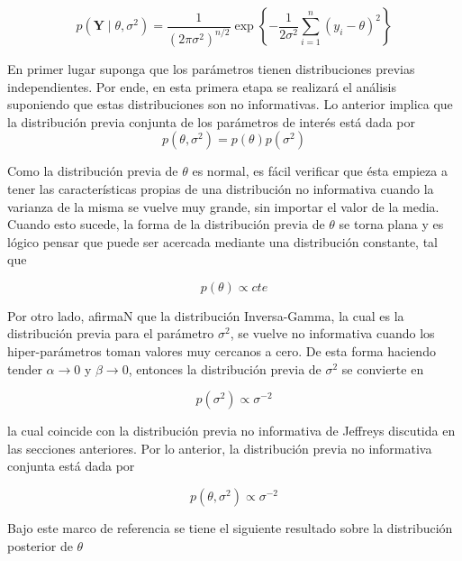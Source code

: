 \documentclass[
  10pt,
  spanish,
]{book}
\theoremstyle{definition}
\theoremstyle{definition}
\theoremstyle{definition}
\theoremstyle{definition}
\theoremstyle{remark}
\begin{document}
\begin{equation*}
\label{eq:VeroNormal}
p(\mathbf{Y} \mid \theta, \sigma^2)=\frac{1}{(2\pi\sigma^2)^{n/2}}\exp\left\{-\frac{1}{2\sigma^2}\sum_{i=1}^n(y_i-\theta)^2\right\}
\end{equation*}

En primer lugar suponga que los parámetros tienen distribuciones previas independientes. Por ende, en esta primera etapa se realizará el análisis suponiendo que estas distribuciones son no informativas. Lo anterior implica que la distribución previa conjunta de los parámetros de interés está dada por
\begin{equation}
p(\theta,\sigma^2)=p(\theta)p(\sigma^2)
\end{equation}

Como la distribución previa de \(\theta\) es normal, es fácil verificar que ésta empieza a tener las características propias de una distribución no informativa cuando la varianza de la misma se vuelve muy grande, sin importar el valor de la media. Cuando esto sucede, la forma de la distribución previa de \(\theta\) se torna plana y es lógico pensar que puede ser acercada mediante una distribución constante, tal que

\begin{equation*}
p(\theta)\propto cte
\end{equation*}

Por otro lado, \citet{Gelman03} afirmaN que la distribución Inversa-Gamma, la cual es la distribución previa para el parámetro \(\sigma^2\), se vuelve no informativa cuando los hiper-parámetros toman valores muy cercanos a cero. De esta forma haciendo tender \(\alpha \longrightarrow 0\) y \(\beta \longrightarrow 0\), entonces la distribución previa de \(\sigma^2\) se convierte en

\begin{equation*}
p(\sigma^2)\propto \sigma^{-2}
\end{equation*}

la cual coincide con la distribución previa no informativa de Jeffreys discutida en las secciones anteriores. Por lo anterior, la distribución previa no informativa conjunta está dada por

\begin{equation}
p(\theta,\sigma^2)\propto \sigma^{-2}
\end{equation}

Bajo este marco de referencia se tiene el siguiente resultado sobre la distribución posterior de \(\theta\)
\end{document}
